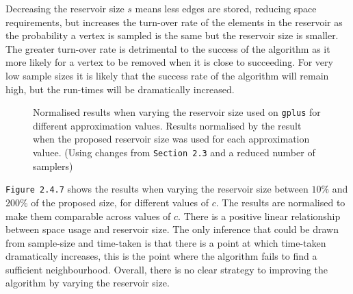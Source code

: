 \documentclass[11pt,twoside,a4paper]{report}
\begin{document}
\par Decreasing the reservoir size $s$ means less edges are stored, reducing space requirements, but increases the turn-over rate of the elements in the reservoir as the probability a vertex is sampled is the same but the reservoir size is smaller. The greater turn-over rate is detrimental to the success of the algorithm as it more likely for a vertex to be removed when it is close to succeeding. For very low sample sizes it is likely that the success rate of the algorithm will remain high, but the run-times will be dramatically increased.

\begin{figure}[H]
	\label{Figure 8}
	\caption{Normalised results when varying the reservoir size used on \texttt{gplus} for different approximation values. Results normalised by the result when the proposed reservoir size was used for each approximation valuee. (Using changes from \texttt{Section 2.3} and a reduced number of samplers)}
\end{figure}

\par \texttt{Figure 2.4.7} shows the results when varying the reservoir size between $10\%$ and $200\%$ of the proposed size, for different values of $c$. The results are normalised to make them comparable across values of $c$. There is a positive linear relationship between space usage and reservoir size. The only inference that could be drawn from sample-size and time-taken is that there is a point at which time-taken dramatically increases, this is the point where the algorithm fails to find a sufficient neighbourhood. Overall, there is no clear strategy to improving the algorithm by varying the reservoir size.
\end{document}
